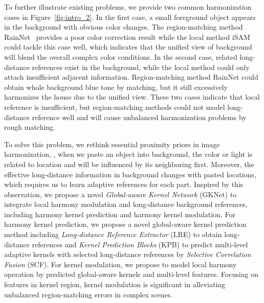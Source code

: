 \documentclass[10pt,twocolumn,letterpaper]{article}
\begin{document}
To further illustrate existing problems, we provide two common harmonization cases in Figure~\ref{fig:intro_2}. In the first case, a small foreground object appears in the background with obvious color changes. The region-matching method RainNet~\cite{Cong_2020_CVPR} provides a poor color correction result while the local method iSAM~\cite{Sofiiuk_2021_WACV} could tackle this case well, which indicates that the unified view of background will blend the overall complex color conditions. In the second case, related long-distance references exist in the background, while the local method could only attach insufficient adjacent information. Region-matching method RainNet could obtain whole background blue tone by matching, but it still excessively harmonizes the house due to the unified view. These two cases indicate that local reference is insufficient, but region-matching methods could not model long-distance reference well and will cause unbalanced harmonization problems by rough matching. 

To solve this problem, we rethink essential proximity priors in image harmonization, \ie, when we paste an object into background, the color or light is related to location and will be influenced by its neighboring first. Moreover, the effective long-distance information in background changes with pasted locations, which requires us to learn adaptive references for each part. Inspired by this observation, we propose a novel \emph{Global-aware Kernel Network} (GKNet) to integrate local harmony modulation and long-distance background references, including harmony kernel prediction and harmony kernel modulation. For harmony kernel prediction, we propose a novel global-aware kernel prediction method including \emph{Long-distance Reference Extractor} (LRE) to obtain long-distance references and \emph{Kernel Prediction Blocks} (KPB) to predict multi-level adaptive kernels with selected long-distance references by \emph{Selective Correlation Fusion} (SCF). For kernel modulation, we propose to model local harmony operation by predicted global-aware kernels and multi-level features. Focusing on features in kernel region, kernel modulation is significant in alleviating unbalanced region-matching errors in complex scenes.
\end{document}
